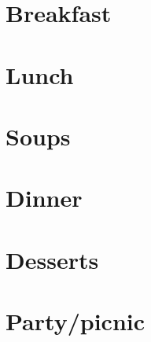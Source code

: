 \documentclass[%
twoside,
11pt
]{article}
\begin{document}
\section{Breakfast}


\newpage

\newpage

\newpage

\newpage

\newpage

\newpage

\section{Lunch}


\newpage

\newpage

\newpage

\newpage

\newpage

\newpage

\newpage

\section{Soups}


\newpage

\newpage

\newpage

\newpage

\newpage


\section{Dinner}


\newpage

\newpage

\newpage

\newpage

\newpage

\newpage

\newpage

\newpage
\newpage

\newpage

\newpage

\newpage

\newpage

\newpage

\newpage

\section{Desserts}

\newpage

\newpage

\newpage

\newpage

\newpage

\newpage

\newpage

\newpage


\section{Party/picnic}


\newpage

\newpage

\newpage

\newpage

\newpage
\end{document}

